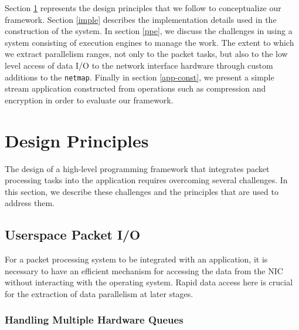 \documentclass[conference]{IEEEtran}
\newcommand{\comment}[1]{}
\begin{document}
Section \ref{dppl} represents the design principles that we follow to conceptualize our framework. Section \ref{imple} describes the implementation details used in the construction of the system. In section \ref{ppe}, we discuss the challenges in using a system consisting of execution engines to manage the work. The extent to which we extract parallelism ranges, not only to the packet tasks, but also to the low level access of data I/O to the network interface hardware through custom additions to the \texttt{netmap}. Finally in section \ref{app-const}, we present a simple stream application constructed from operations such as compression and encryption in order to evaluate our framework.

\section{Design Principles}
\label{dppl}

The design of a high-level programming framework that integrates packet processing tasks into the application requires overcoming several challenges. \comment{The entire system is driven by the extent to which parallelism can be extracted. Some of the techniques that can be applied to the packet processing tasks can be used for the tasks related to the application.} In this section, we describe these challenges and the principles that are used to address them. \comment{We focus on the methodologies related to the packet processing tasks and the parallel processing engine itself.}

\subsection{Userspace Packet I/O}

For a packet processing system to be integrated with an application, it is necessary to have an efficient mechanism for accessing the data from the NIC without interacting with the operating system. Rapid data access here is crucial for the extraction of data parallelism at later stages. \comment{In using the techniques described below we exploit the modern NIC architecture to its full potential.}

\subsubsection{Handling Multiple Hardware Queues}
\end{document}
